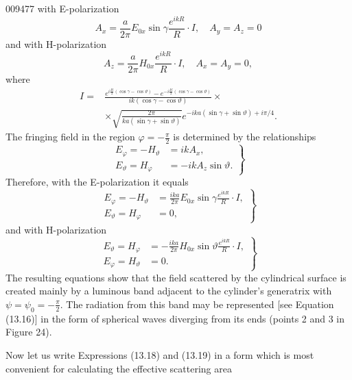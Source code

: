 \begin{scanpage}{0094}{77}
with E-polarization
\[A_x=\frac a{2\pi}E_{0x}\sin\gamma\frac{e^{ikR}}R\cdot I,\quad A_y=A_z=0\tag{13.14}\]
and with H-polarization
\[A_z=\frac a{2\pi}H_{0x}\frac{e^{ikR}}R\cdot I,\quad A_x=A_y=0,\tag{13.15}\]
where
\[
\begin{aligned}
I={}&\frac{e^{i\frac{kl}2(\cos\gamma-\cos\vartheta)}-e^{-i\frac{kl}2(\cos\gamma-\cos\vartheta)}}{ik(\cos\gamma-\cos\vartheta)}\times\\
&\times\sqrt{\frac{2\pi}{ka(\sin\gamma+\sin\vartheta)}}e^{-ika(\sin\gamma+\sin\vartheta)+i\pi/4}.
\end{aligned}\tag{13.16}
\]
The fringing field in the region $\varphi=-\frac\pi2$ is determined by the relationships
\[\left.\begin{aligned}E_\varphi=-H_\vartheta&=ikA_x,\\E_\vartheta=H_\varphi&=-ikA_z\sin\vartheta.\end{aligned}\right\}\tag{13.17}\]
Therefore, with the E-polarization it equals
\[\left.\begin{aligned}E_\varphi=-H_\vartheta&=\frac{ika}{2\pi}E_{0x}\sin\gamma\frac{e^{ikR}}R\cdot I,\\E_\vartheta=H_\varphi&=0,\end{aligned}\right\}\tag{13.18}\]
and with H-polarization
\[\left.\begin{aligned}E_\vartheta=H_\varphi&=-\frac{ika}{2\pi}H_{0x}\sin\vartheta\frac{e^{ikR}}R\cdot I,\\E_\varphi=H_\vartheta&=0.\end{aligned}\right\}\tag{13.19}\]
The resulting equations show that the field scattered by the cylindrical surface is created mainly by a luminous band adjacent to the cylinder's generatrix with $\psi=\psi_0=-\frac\pi2$. The radiation from this band may be represented [see Equation (13.16)] in the form of spherical waves diverging from its ends (points 2 and 3 in Figure 24).

Now let us write Expressions (13.18) and (13.19) in a form which is most convenient for calculating the effective scattering area
\end{scanpage}
